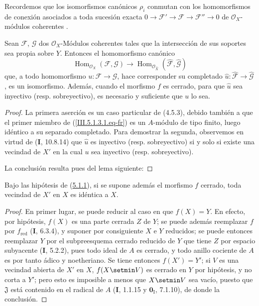 Recordemos que los isomorfismos canónicos $\rho_i$ conmutan con los
homomorfismos de conexión asociados a toda sucesión exacta
$0\to\mathcal F'\to\mathcal F\to\mathcal F''\to0$
de $\mathcal O_X$-módulos coherentes
 .

\begin{corollary}[5.1.3]
\label{III.5.1.3-fr}
Sean $\mathcal F$, $\mathcal G$ dos $\mathcal O_X$-Módulos coherentes tales que
la intersección de sus soportes sea propia sobre $Y$. Entonces el homomorfismo canónico
\begin{equation}
\operatorname{Hom}_{\mathcal O_X}(\mathcal F,\mathcal G)
\longrightarrow
\operatorname{Hom}_{\mathcal O_{\widehat X}}
(\widehat{\mathcal F},\widehat{\mathcal G})
\tag{5.1.3.1}
\label{III.5.1.3.1.eq-fr}
\end{equation}
que, a todo homomorfismo $u:\mathcal F\to\mathcal G$, hace corresponder su
completado $\widehat u:\widehat{\mathcal F}\to\widehat{\mathcal G}$, es un
isomorfismo. Además, cuando el morfismo $f$ es cerrado, para que $\widehat u$ sea
inyectivo (\textup{resp.} sobreyectivo), es necesario y suficiente que $u$ lo sea.
\end{corollary}

\begin{proof}
La primera aserción es un caso particular de (4.5.3), debido también a que el
primer miembro de (\ref{III.5.1.3.1.eq-fr}) es un $A$-módulo de tipo finito, luego
idéntico a su separado completado. Para demostrar la segunda, observemos en virtud de
(\textbf{I}, 10.8.14) que $\widehat u$ es inyectivo (resp. sobreyectivo) si y solo si existe
una vecindad de $X'$ en la cual $u$ sea inyectivo (resp. sobreyectivo).

La conclusión
resulta pues del lema siguiente:
\end{proof}

\begin{lemma}[5.1.3.1]
\label{III.5.1.3.1-fr}
Bajo las hipótesis de \textup{(\hyperref[III.5.1.1-fr]{5.1.1})}, si se supone además el
morfismo $f$ cerrado, toda vecindad de $X'$ en $X$ es idéntica a $X$.
\end{lemma}

\begin{proof}
En primer lugar, se puede reducir al caso en que $f(X)=Y$. En efecto, por hipótesis,
$f(X)$ es una parte cerrada $Z$ de $Y$; se puede además reemplazar $f$ por
$f_{\mathrm{red}}$ (\textbf{I}, 6.3.4), y suponer por consiguiente $X$ e $Y$ reducidos; se puede entonces
reemplazar $Y$ por el subpreesquema cerrado reducido de $Y$ que tiene $Z$ por espacio
subyacente (\textbf{I}, 5.2.2), pues todo ideal de $A$ es cerrado, y todo anillo cociente de
$A$ es por tanto ádico y noetheriano. Se tiene entonces $f(X')=Y'$; si $V$ es una vecindad
abierta de $X'$ en $X$, $f(X\setmin V)$ es cerrado en $Y$ por hipótesis, y no corta
a $Y'$; pero esto es imposible a menos que $X\setmin V$ sea vacío, puesto que
$\mathfrak J$ está contenido en el radical de $A$ (\textbf{I}, 1.1.15 y $\mathbf{0}_{\mathrm I}$,
7.1.10), de donde la conclusión.
\end{proof}

